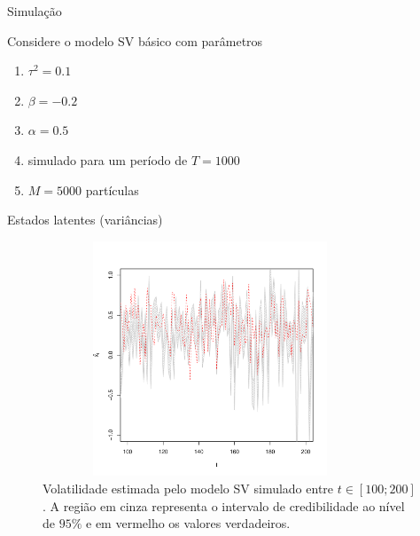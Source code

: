 \documentclass{beamer}
\begin{document}
\begin{frame}{Simulação}

Considere o modelo SV básico com parâmetros 
\begin{enumerate}
\item $\tau^2=0.1$
\item $\beta=-0.2$ 
\item $\alpha=0.5$ 
\item simulado para um período de $T=1000$
\item $M=5000$ partículas
\end{enumerate}


\end{frame}




\begin{frame}{Estados latentes (variâncias)}


\begin{figure}
\begin{center}
 \includegraphics[height=7cm,width =10cm]{processo_1_01_02_05.pdf}
 \end{center}
\caption{Volatilidade estimada pelo modelo SV simulado entre $t \in [100 ;200]$. A região em cinza representa o intervalo de credibilidade ao nível de $95\%$ e em vermelho os valores verdadeiros.} 
\end{figure}

 \end{frame}
 
\end{document}

